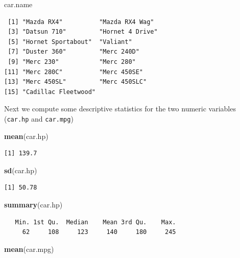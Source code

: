 \documentclass[
]{krantz}
\makeatletter
\newenvironment{Shaded}{\begin{snugshade}}{\end{snugshade}}
\newcommand{\KeywordTok}[1]{\textcolor[rgb]{0.27,0.27,0.27}{\textbf{#1}}}
\newcommand{\NormalTok}[1]{#1}
\newenvironment{kframe}{%
\medskip{}
\setlength{\fboxsep}{.8em}
 \def\at@end@of@kframe{}%
 \ifinner\ifhmode%
  \def\at@end@of@kframe{\end{minipage}}%
  \begin{minipage}{\columnwidth}%
 \fi\fi%
 \def\FrameCommand##1{\hskip\@totalleftmargin \hskip-\fboxsep
 \colorbox{shadecolor}{##1}\hskip-\fboxsep
     \hskip-\linewidth \hskip-\@totalleftmargin \hskip\columnwidth}%
 \MakeFramed {\advance\hsize-\width
   \@totalleftmargin\z@ \linewidth\hsize
   \@setminipage}}%
 {\par\unskip\endMakeFramed%
 \at@end@of@kframe}
\renewenvironment{Shaded}{\begin{kframe}}{\end{kframe}}
\makeatother
\begin{document}
\begin{Shaded}
\begin{Highlighting}[]
\NormalTok{car.name}
\end{Highlighting}
\end{Shaded}

\begin{verbatim}
 [1] "Mazda RX4"          "Mazda RX4 Wag"     
 [3] "Datsun 710"         "Hornet 4 Drive"    
 [5] "Hornet Sportabout"  "Valiant"           
 [7] "Duster 360"         "Merc 240D"         
 [9] "Merc 230"           "Merc 280"          
[11] "Merc 280C"          "Merc 450SE"        
[13] "Merc 450SL"         "Merc 450SLC"       
[15] "Cadillac Fleetwood"
\end{verbatim}

Next we compute some descriptive statistics for the two numeric variables (\texttt{car.hp} and \texttt{car.mpg})

\begin{Shaded}
\begin{Highlighting}[]
\KeywordTok{mean}\NormalTok{(car.hp)}
\end{Highlighting}
\end{Shaded}

\begin{verbatim}
[1] 139.7
\end{verbatim}

\begin{Shaded}
\begin{Highlighting}[]
\KeywordTok{sd}\NormalTok{(car.hp)}
\end{Highlighting}
\end{Shaded}

\begin{verbatim}
[1] 50.78
\end{verbatim}

\begin{Shaded}
\begin{Highlighting}[]
\KeywordTok{summary}\NormalTok{(car.hp)}
\end{Highlighting}
\end{Shaded}

\begin{verbatim}
   Min. 1st Qu.  Median    Mean 3rd Qu.    Max. 
     62     108     123     140     180     245 
\end{verbatim}

\begin{Shaded}
\begin{Highlighting}[]
\KeywordTok{mean}\NormalTok{(car.mpg)}
\end{Highlighting}
\end{Shaded}
\end{document}
